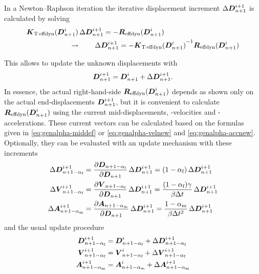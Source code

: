 In a Newton--Raphson iteration the iterative displacement increment
$\Delta\boldsymbol{D}_{n+1}^{i+1}$ is calculated by solving
\begin{align}
&  \boldsymbol{K}_{\text{T}\,\text{effdyn}}(\boldsymbol{D}_{n+1}^i)\, \Delta\boldsymbol{D}_{n+1}^{i+1}
  = - \boldsymbol{R}_{\text{effdyn}}(\boldsymbol{D}_{n+1}^i)
\\
& \qquad\qquad\qquad\leadsto\qquad
  \Delta\boldsymbol{D}_{n+1}^{i+1}
  = - {\boldsymbol{K}_{\text{T}\,\text{effdyn}}(\boldsymbol{D}_{n+1}^i)}^{-1} \boldsymbol{R}_{\text{effdyn}}(\boldsymbol{D}_{n+1}^i)
\end{align}

This allows to update the unknown displacements with
\begin{equation}
  \boldsymbol{D}_{n+1}^{i+1}
  = \boldsymbol{D}_{n+1}^{i} + \Delta\boldsymbol{D}_{n+1}^{i+1}
  \text{.}
\end{equation}
In essence, the actual right-hand-side $\boldsymbol{R}_{\text{effdyn}}(\boldsymbol{D}_{n+1}^{i})$ depends as shown only on the actual end-displacements $\boldsymbol{D}_{n+1}^{i+1}$,
but it is convenient to calculate $\boldsymbol{R}_{\text{effdyn}}(\boldsymbol{D}_{n+1}^i)$ using
the 
current mid-displacements, -velocities and -accelerations. These
current vectors can be calculated based on the formulas given in
\eqref{eq:genalpha-middef} or \eqref{eq:genalpha-velnew} and
\eqref{eq:genalpha-accnew}.  Optionally, they can be evaluated with an update
mechanism with these increments
\begin{equation}
\begin{aligned}
   \Delta\boldsymbol{D}_{n+1-\alpha_\text{f}}^{i+1}
&   = \frac{\partial\boldsymbol{D}_{n+1-\alpha_\text{f}}}{\partial\boldsymbol{D}_{n+1}} 
     \, \Delta\boldsymbol{D}_{n+1}^{i+1}
   = (1-\alpha_\text{f}) \, \Delta\boldsymbol{D}_{n+1}^{i+1}
\\
   \Delta\boldsymbol{V}_{n+1-\alpha_\text{f}}^{i+1}
&   = \frac{\partial\boldsymbol{V}_{n+1-\alpha_\text{f}}}{\partial\boldsymbol{D}_{n+1}} 
     \, \Delta\boldsymbol{D}_{n+1}^{i+1}
   = \frac{(1-\alpha_\text{f})\gamma}{\beta \Delta t} \, \Delta\boldsymbol{D}_{n+1}^{i+1}
\\
   \Delta\boldsymbol{A}_{n+1-\alpha_\text{m}}^{i+1}
&   = \frac{\partial\boldsymbol{A}_{n+1-\alpha_\text{m}}}{\partial\boldsymbol{D}_{n+1}} 
     \, \Delta\boldsymbol{D}_{n+1}^{i+1}
   = \frac{1-\alpha_\text{m}}{\beta \Delta t^2} \, \Delta\boldsymbol{D}_{n+1}^{i+1}
\end{aligned}
\end{equation}
and the usual update procedure
\begin{equation}
\begin{aligned}
   \boldsymbol{D}_{n+1-\alpha_\text{f}}^{i+1}
&  = \boldsymbol{D}_{n+1-\alpha_\text{f}}^{i} 
   + \Delta\boldsymbol{D}_{n+1-\alpha_\text{f}}^{i+1}
\\
   \boldsymbol{V}_{n+1-\alpha_\text{f}}^{i+1}
&  = \boldsymbol{V}_{n+1-\alpha_\text{f}}^{i} 
   + \Delta\boldsymbol{V}_{n+1-\alpha_\text{f}}^{i+1}
\\
   \boldsymbol{A}_{n+1-\alpha_\text{m}}^{i+1}
&  = \boldsymbol{A}_{n+1-\alpha_\text{m}}^{i} 
   + \Delta\boldsymbol{A}_{n+1-\alpha_\text{m}}^{i+1}
\\
\end{aligned}
\end{equation}

